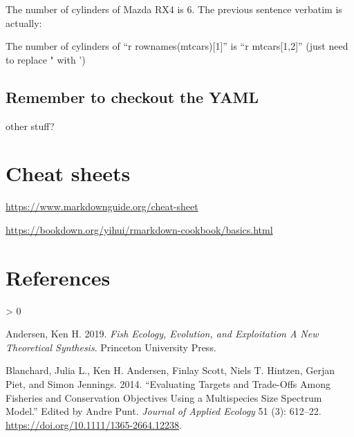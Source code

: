 \documentclass[
  11pt,
]{article}
\newlength{\cslhangindent}
\newenvironment{CSLReferences}[2] %
 {%
  \setlength{\parindent}{0pt}
  \ifodd #1 \everypar{\setlength{\hangindent}{\cslhangindent}}\ignorespaces\fi
  \ifnum #2 > 0
  \setlength{\parskip}{#2\baselineskip}
  \fi
 }%
 {}
\begin{document}
The number of cylinders of Mazda RX4 is 6. The previous sentence verbatim is actually:

The number of cylinders of ``r rownames(mtcars){[}1{]}'' is ``r mtcars{[}1,2{]}'' (just need to replace " with ')

\hypertarget{remember-to-checkout-the-yaml}{%
\subsection{Remember to checkout the YAML}\label{remember-to-checkout-the-yaml}}

other stuff?

\hypertarget{cheat-sheets}{%
\section{Cheat sheets}\label{cheat-sheets}}

\url{https://www.markdownguide.org/cheat-sheet}

\url{https://bookdown.org/yihui/rmarkdown-cookbook/basics.html}

\hypertarget{references}{%
\section*{References}\label{references}}

\hypertarget{refs}{}
\begin{CSLReferences}{1}{0}
\leavevmode\hypertarget{ref-andersen_fish_2019}{}%
Andersen, Ken H. 2019. \emph{Fish {Ecology}, {Evolution}, and {Exploitation A New Theoretical Synthesis}}. {Princeton University Press}.

\leavevmode\hypertarget{ref-blanchard_evaluating_2014}{}%
Blanchard, Julia L., Ken H. Andersen, Finlay Scott, Niels T. Hintzen, Gerjan Piet, and Simon Jennings. 2014. {``Evaluating Targets and Trade-Offs Among Fisheries and Conservation Objectives Using a Multispecies Size Spectrum Model.''} Edited by Andre Punt. \emph{Journal of Applied Ecology} 51 (3): 612--22. \url{https://doi.org/10.1111/1365-2664.12238}.

\end{CSLReferences}
\end{document}
